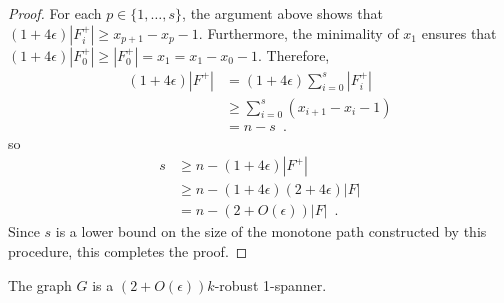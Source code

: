 \documentclass{patmorin}
\begin{document}
\begin{proof}
 For each $p\in\{1,\ldots,s\}$, the argument above shows that $(1+4\epsilon)|F_i^+|\ge x_{p+1}-x_p-1$.
  Furthermore, the minimality of $x_1$ ensures that $(1+4\epsilon)|F_0^+|\ge |F_0^+|=x_1=x_1-x_0-1$.  
   Therefore,
  \begin{align*}
	  (1+4\epsilon)|F^+| & = (1+4\epsilon)\sum_{i=0}^s |F^+_i| \\
		& \ge \sum_{i=0}^s (x_{i+1}-x_i-1) \\
		& = n-s \enspace .
  \end{align*}
  so 
  \begin{align*}
	  s & \ge n-(1+4\epsilon)|F^+| \\
	  & \ge n-(1+4\epsilon)(2+4\epsilon)|F|\\
	  & =n-(2+O(\epsilon))|F| \enspace . 
  \end{align*}
  Since $s$ is a lower bound on the size of the monotone path
  constructed by this procedure, this completes the proof.
\end{proof}

\begin{cor}
	The graph $G$ is a $(2+O(\epsilon))k$-robust 1-spanner.
\end{cor}
\end{document}
